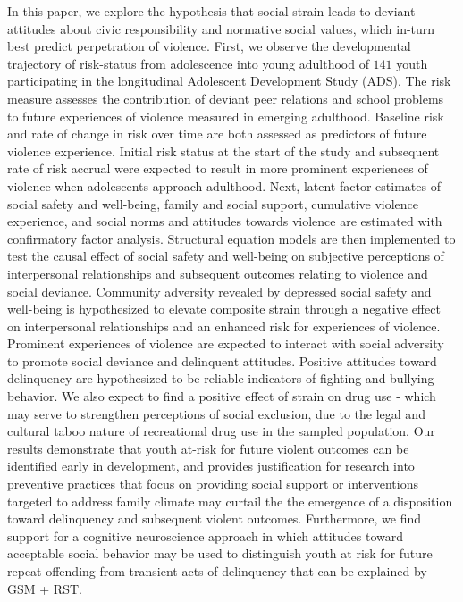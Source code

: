 \documentclass[utf8]{article}
\begin{document}
In this paper, we explore the hypothesis that social strain leads to deviant attitudes about civic responsibility and normative social values, which in-turn best predict perpetration of violence. First, we observe the developmental trajectory of risk-status from adolescence into young adulthood of $141$ youth participating in the longitudinal Adolescent Development Study (ADS). The risk measure assesses the contribution of deviant peer relations and school problems to future experiences of violence measured in emerging adulthood. Baseline risk and rate of change in risk over time are both assessed as predictors of future violence experience. Initial risk status at the start of the study and subsequent rate of risk accrual were expected to result in more prominent experiences of violence when adolescents approach adulthood. Next, latent factor estimates of social safety and well-being, family and social support, cumulative violence experience, and social norms and attitudes towards violence are estimated with confirmatory factor analysis. Structural equation models are then implemented to test the causal effect of social safety and well-being on subjective perceptions of interpersonal relationships and subsequent outcomes relating to violence and social deviance. Community adversity revealed by depressed social safety and well-being is hypothesized to elevate composite strain through a negative effect on interpersonal relationships and an enhanced risk for experiences of violence. Prominent experiences of violence are expected to interact with social adversity to promote social deviance and delinquent attitudes. Positive attitudes toward delinquency are hypothesized to be reliable indicators of fighting and bullying behavior. We also expect to find a positive effect of strain on drug use - which may serve to strengthen perceptions of social exclusion, due to the legal and cultural taboo nature of recreational drug use in the sampled population. Our results demonstrate that youth at-risk for future violent outcomes can be identified early in development, and provides justification for research into preventive practices that focus on providing social support or interventions targeted to address family climate may curtail the the emergence of a disposition toward delinquency and subsequent violent outcomes. Furthermore, we find support for a cognitive neuroscience approach in which attitudes toward acceptable social behavior may be used to distinguish youth at risk for future repeat offending from transient acts of delinquency that can be explained by GSM + RST.
\end{document}
